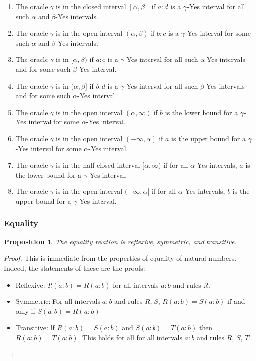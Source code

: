 \documentclass[12pt]{article}
\newtheorem{proposition}{Proposition}[subsection]
\theoremstyle{remark}
\begin{document}
\begin{enumerate}
\item The oracle $\gamma$ is in the closed interval $[\alpha, \beta]$ if $a:d$ is a $\gamma$-Yes interval for all such $\alpha$ and $\beta$-Yes intervals. 
\item The oracle $\gamma$ is in the open interval $(\alpha, \beta)$ if $b:c$ is a $\gamma$-Yes interval for some such $\alpha$ and $\beta$-Yes intervals. 
\item The oracle $\gamma$ is in $[\alpha, \beta)$ if $a:c$ is a $\gamma$-Yes interval for all such $\alpha$-Yes intervals and for some such $\beta$-Yes interval.
\item The oracle $\gamma$ is in $(\alpha, \beta]$ if $b:d$ is a $\gamma$-Yes interval for all such $\beta$-Yes intervals and for some such $\alpha$-Yes interval.
\item The oracle $\gamma$ is in the open interval $(\alpha, \infty)$ if $b$ is the lower bound for a $\gamma$-Yes interval for some $\alpha$-Yes interval. 
\item The oracle $\gamma$ is in the open interval $(-\infty, \alpha)$ if $a$ is the upper bound for a $\gamma$-Yes interval for some $\alpha$-Yes interval. 
\item The oracle $\gamma$ is in the half-closed interval $[\alpha, \infty)$ if for all $\alpha$-Yes intervals, $a$ is the lower bound for a $\gamma$-Yes interval. 
\item The oracle $\gamma$ is in the open interval $(-\infty, \alpha]$ if for all $\alpha$-Yes intervals, $b$ is the upper bound for a $\gamma$-Yes interval. 
\end{enumerate}


\subsubsection{Equality}

\begin{proposition}\label{pr:reflexive}
The equality relation is reflexive, symmetric, and transitive. 
\end{proposition}

\begin{proof}
This is immediate from the properties of equality of natural numbers. Indeed, the statements of these are the proofs:
\begin{itemize}
    \item Reflexive: $R(a:b)=R(a:b)$ for all intervals $a:b$ and rules $R$.
    \item Symmetric: For all intervals $a:b$ and rules $R$, $S$, $R(a:b)=S(a:b)$ if and only if $S(a:b) = R(a:b)$ 
    \item Transitive: If $R(a:b)=S(a:b)$ and $S(a:b) = T(a:b)$ then $R(a:b)=T(a:b)$. This holds for all for all intervals $a:b$ and rules $R$, $S$, $T$.
\end{itemize}
\end{proof}
\end{document}
